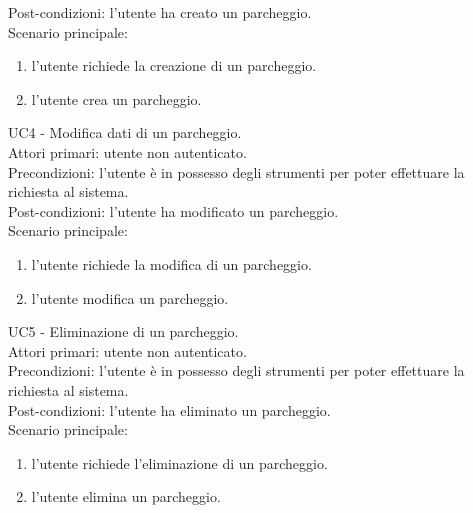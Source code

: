 Post-condizioni: l'utente ha creato un parcheggio.
\\
Scenario principale:
\begin{enumerate}
    \item l'utente richiede la creazione di un parcheggio.
    \item l'utente crea un parcheggio.
\end{enumerate}
\leavevmode\newline
UC4 - Modifica dati di un parcheggio.
\\
Attori primari: utente non autenticato.
\\
Precondizioni: l'utente è in possesso degli strumenti per poter effettuare la richiesta al sistema.
\\
Post-condizioni: l'utente ha modificato un parcheggio.
\\
Scenario principale:
\begin{enumerate}
    \item l'utente richiede la modifica di un parcheggio.
    \item l'utente modifica un parcheggio.
\end{enumerate}
\leavevmode\newline
UC5 - Eliminazione di un parcheggio.
\\
Attori primari: utente non autenticato.
\\
Precondizioni: l'utente è in possesso degli strumenti per poter effettuare la richiesta al sistema.
\\
Post-condizioni: l'utente ha eliminato un parcheggio.
\\
Scenario principale:
\begin{enumerate}
    \item l'utente richiede l'eliminazione di un parcheggio.
    \item l'utente elimina un parcheggio.
\end{enumerate}

\leavevmode\newline

